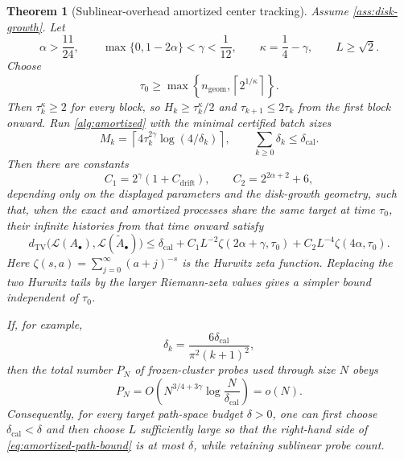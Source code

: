 \documentclass[11pt]{article}
\theoremstyle{mainthm}
\newtheorem{theorem}{Theorem}[section]
\theoremstyle{definition}
\theoremstyle{remark}
\newcommand{\Law}{\mathcal L}
\newcommand{\dTV}{d_{\mathrm{TV}}}
\begin{document}
\begin{theorem}[Sublinear-overhead amortized center tracking]
\label{thm:amortized}
Assume \cref{ass:disk-growth}. Let
\[
  \alpha>\frac{11}{24},
  \qquad
  \max\{0,1-2\alpha\}<\gamma<\frac1{12},
  \qquad
  \kappa=\frac14-\gamma,
  \qquad
  L\ge\sqrt2.
\]
Choose
\[
  \tau_0\ge
  \max\left\{n_{\mathrm{geom}},\left\lceil2^{1/\kappa}\right\rceil\right\}.
\]
Then $\tau_k^\kappa\ge2$ for every block, so $H_k\ge\tau_k^\kappa/2$ and $\tau_{k+1}\le2\tau_k$ from the first block onward. Run \cref{alg:amortized} with the minimal certified batch sizes
\begin{equation}
  M_k=
  \left\lceil4\tau_k^{2\gamma}\log(4/\delta_k)\right\rceil,
  \qquad
  \sum_{k\ge0}\delta_k\le\delta_{\mathrm{cal}}.
  \label{eq:batch-size}
\end{equation}
Then there are constants
\begin{equation}
  C_1=2^\gamma(1+C_{\mathrm{drift}}),
  \qquad
  C_2=2^{2\alpha+2}+6,
  \label{eq:amortized-constants}
\end{equation}
depending only on the displayed parameters and the disk-growth geometry, such that, when the exact and amortized processes share the same target at time $\tau_0$, their infinite histories from that time onward satisfy
\begin{equation}
\boxed{
  \dTV\bigl(\Law(A_\bullet),\Law(\widetilde A_\bullet)\bigr)
  \le
  \delta_{\mathrm{cal}}
  +C_1L^{-2}\zeta(2\alpha+\gamma,\tau_0)
  +C_2L^{-4}\zeta(4\alpha,\tau_0).
}
\label{eq:amortized-path-bound}
\end{equation}
Here $\zeta(s,a)=\sum_{j=0}^{\infty}(a+j)^{-s}$ is the Hurwitz zeta function. Replacing the two Hurwitz tails by the larger Riemann-zeta values gives a simpler bound independent of $\tau_0$.

If, for example,
\begin{equation}
  \delta_k=\frac{6\delta_{\mathrm{cal}}}{\pi^2(k+1)^2},
  \label{eq:failure-schedule}
\end{equation}
then the total number $P_N$ of frozen-cluster probes used through size $N$ obeys
\begin{equation}
\boxed{
  P_N
  =O\!\left(
    N^{3/4+3\gamma}
    \log\frac{N}{\delta_{\mathrm{cal}}}
  \right)
  =o(N).
}
\label{eq:sublinear-probes}
\end{equation}
Consequently, for every target path-space budget $\delta>0$, one can first choose $\delta_{\mathrm{cal}}<\delta$ and then choose $L$ sufficiently large so that the right-hand side of \eqref{eq:amortized-path-bound} is at most $\delta$, while retaining sublinear probe count.
\end{theorem}
\end{document}
